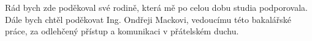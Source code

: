 \documentclass[11pt,twoside,a4paper]{book}
\begin{document}
	
	\translate				%

	

	\coverpagestarts


	\acknowledgements
	\noindent
	Rád bych zde poděkoval své rodině, která mě po celou dobu studia podporovala. Dále bych chtěl poděkovat Ing. Ondřeji Mackovi, vedoucímu této bakalářské práce, za odlehčený přístup a komunikaci v přátelském duchu.





 
	\abstractpage
\end{document}
